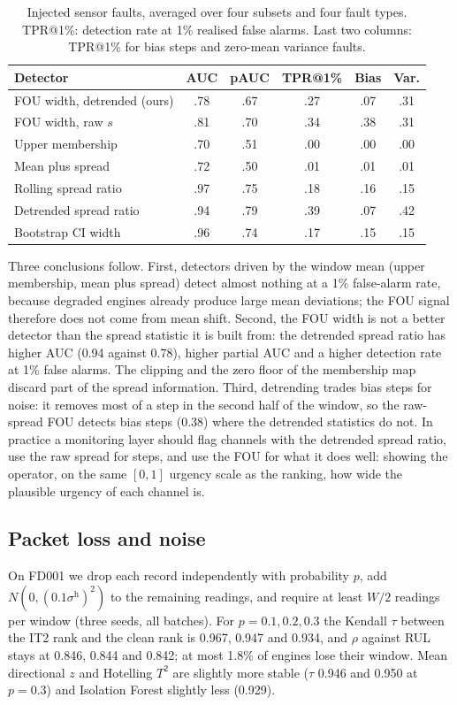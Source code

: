 \documentclass[journal,10pt,twocolumn]{IEEEtran}
\begin{document}
\begin{table}[t]
\centering
\footnotesize
\caption{Injected sensor faults, averaged over four subsets and four fault types. TPR@1\%: detection rate at 1\% realised false alarms. Last two columns: TPR@1\% for bias steps and zero-mean variance faults.}
\label{tab:fault}
\setlength{\tabcolsep}{2.5pt}
\begin{tabular}{lccccc}
\toprule
Detector & AUC & pAUC & TPR@1\% & Bias & Var. \\
\midrule
FOU width, detrended (ours) & .78 & .67 & .27 & .07 & .31 \\
FOU width, raw $s$ & .81 & .70 & .34 & .38 & .31 \\
Upper membership & .70 & .51 & .00 & .00 & .00 \\
Mean plus spread & .72 & .50 & .01 & .01 & .01 \\
Rolling spread ratio & .97 & .75 & .18 & .16 & .15 \\
Detrended spread ratio & .94 & .79 & .39 & .07 & .42 \\
Bootstrap CI width & .96 & .74 & .17 & .15 & .15 \\
\bottomrule
\end{tabular}
\end{table}
Three conclusions follow. First, detectors driven by the window mean (upper membership, mean plus spread) detect almost nothing at a 1\% false-alarm rate, because degraded engines already produce large mean deviations; the FOU signal therefore does not come from mean shift. Second, the FOU width is not a better detector than the spread statistic it is built from: the detrended spread ratio has higher AUC (0.94 against 0.78), higher partial AUC and a higher detection rate at 1\% false alarms. The clipping and the zero floor of the membership map discard part of the spread information. Third, detrending trades bias steps for noise: it removes most of a step in the second half of the window, so the raw-spread FOU detects bias steps (0.38) where the detrended statistics do not. In practice a monitoring layer should flag channels with the detrended spread ratio, use the raw spread for steps, and use the FOU for what it does well: showing the operator, on the same $[0,1]$ urgency scale as the ranking, how wide the plausible urgency of each channel is.

\subsection{Packet loss and noise}
On FD001 we drop each record independently with probability $p$, add $N(0,(0.1\sigma^{\mathrm h})^2)$ to the remaining readings, and require at least $W/2$ readings per window (three seeds, all batches). For $p=0.1,0.2,0.3$ the Kendall $\tau$ between the IT2 rank and the clean rank is 0.967, 0.947 and 0.934, and $\rho$ against RUL stays at 0.846, 0.844 and 0.842; at most 1.8\% of engines lose their window. Mean directional $z$ and Hotelling $T^2$ are slightly more stable ($\tau$ 0.946 and 0.950 at $p=0.3$) and Isolation Forest slightly less (0.929).
\end{document}

